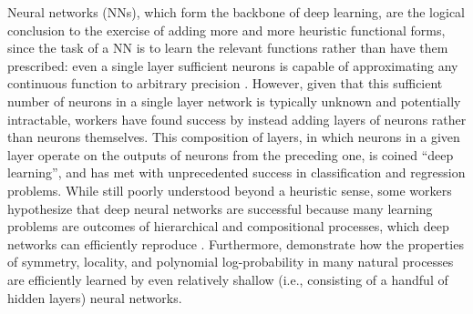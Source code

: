 \documentclass[draft,linenumbers]{agujournal2018}
\begin{document}
Neural networks (NNs), which form the backbone of deep learning, are the logical conclusion to the exercise of adding more and more heuristic functional forms, since the task of a NN is to learn the relevant functions rather than have them prescribed: even a  single  layer   sufficient neurons is capable of approximating any continuous function to arbitrary precision  \citep{Leshno1993,Pinkus1999}. However, given that this sufficient number of neurons in a single layer network is typically unknown and potentially intractable, workers have found success by instead adding layers of neurons rather than neurons themselves. This composition of layers, in which neurons in a given layer operate on the outputs of neurons from the preceding one, is coined ``deep learning'', and has met with unprecedented success in classification and regression problems. While still poorly understood beyond a heuristic sense, some workers hypothesize that deep neural networks are successful because many learning problems are outcomes of hierarchical and compositional processes, which deep networks can efficiently reproduce \citep{Lin2017, Brahma2016}. Furthermore, \cite{Lin2017} demonstrate how the properties of symmetry, locality, and polynomial log-probability in many natural processes are efficiently learned by even relatively shallow (i.e., consisting of a handful of hidden layers) neural networks.

\end{document}
